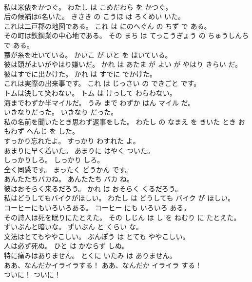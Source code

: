 \documentclass[8pt]{extreport}
\begin{document}
\begin{CJK}{UTF8}{min}
\\	私は米俵をかつぐ。	わたし は こめだわら を かつぐ。	
\\	后の候補は6名いた。	きさき の こうほ は ろくめい いた。	
\\	これは二戸郡の地図である。	これ は にのへぐん の ちず で ある。	
\\	その町は鉄鋼業の中心地である。	その まち は てっこうぎょう の ちゅうしんち で ある。	
\\	蚕が糸を吐いている。	かいこ が いと を はいている。	
\\	彼は頭がよいがやはり嫌いだ。	かれ は あたま が よい が やはり きらい だ。	
\\	彼はすでに出かけた。	かれ は すでに でかけた。	
\\	これは実際の出来事です。	これ は じっさい の できごと です。	
\\	トムは決して笑わない。	トム は けっして わらわない。	
\\	海までわずか半マイルだ。	うみ まで わずか はん マイル だ。	
\\	いきなりだった。	いきなり だった。	
\\	私の名前を聞いたとき思わず返事をした。	わたし の なまえ を きいた とき おもわず へんじ を した。	
\\	すっかり忘れたよ。	すっかり わすれた よ。	
\\	あまりに早く着いた。	あまりに はやく ついた。	
\\	しっかりしろ。	しっかり しろ。	
\\	全く同感です。	まったく どうかん です。	
\\	あんたたちバカね。	あんたたち バカ ね。	
\\	彼はおそらく来るだろう。	かれ は おそらく くるだろう。	
\\	私はどうしてもバイクがほしい。	わたし は どうしても バイク が ほしい。	
\\	コーヒーにもいろいろある。	コーヒー にも いろいろ ある。	
\\	その詩人は死を眠りにたとえた。	その しじん は し を ねむり に たとえた。	
\\	ずいぶんと暗いな。	ずいぶん と くらい な。	
\\	文法はとてもややこしい。	ぶんぽう は とても ややこしい。	
\\	人は必ず死ぬ。	ひと は かならず しぬ。	
\\	特に痛みはありません。	とくに いたみ は ありません。	
\\	ああ、なんだかイライラする！	ああ、なんだか イライラ する！	
\\	ついに！	ついに！	

\end{CJK}
\end{document}
